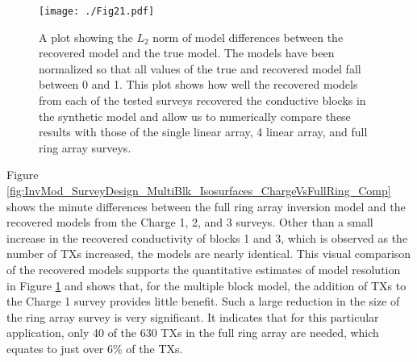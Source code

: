 \documentclass[preprint,authoryear,12pt]{elsarticle}
\begin{document}
\begin{figure} [htp]
   \begin{center}
      \texttt{[image: ./Fig21.pdf]}
   \end{center}
   \vspace{-0.5cm}
\caption{A plot showing the $L_2$ norm of model differences between the recovered model and the true model. The models have been normalized so that all values of the true and recovered model fall between 0 and 1. This plot shows how well the recovered models from each of the tested surveys recovered the conductive blocks in the synthetic model and allow us to numerically compare these results with those of the single linear array, 4 linear array, and full ring array surveys.}
\label{fig:SurveyDesignComp_StraightTunnel_MultiBlk}
\end{figure}


Figure \ref{fig:InvMod_SurveyDesign_MultiBlk_Isosurfaces_ChargeVsFullRing_Comp} shows the minute differences between the full ring array inversion model and the recovered models from the Charge 1, 2, and 3 surveys. Other than a small increase in the recovered conductivity of blocks 1 and 3, which is observed as the number of TXs increased, the models are nearly identical. This visual comparison of the recovered models supports the quantitative estimates of model resolution in Figure \ref{fig:SurveyDesignComp_StraightTunnel_MultiBlk} and shows that, for the multiple block model, the addition of TXs to the Charge 1 survey provides little benefit. Such a large reduction in the size of the ring array survey is very significant. It indicates that for this particular application, only 40 of the 630 TXs in the full ring array are needed, which equates to just over 6\% of the TXs.
\end{document}
